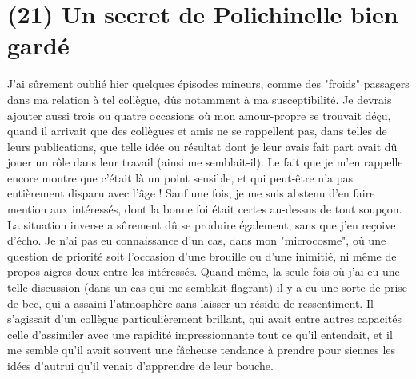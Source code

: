 \section{(21) Un secret de Polichinelle bien gardé}

J'ai sûrement oublié hier quelques épisodes mineurs, comme des "froids" passagers dans ma relation à tel collègue, dûs notamment à ma susceptibilité. Je devrais ajouter aussi trois ou quatre occasions où mon amour-propre se trouvait déçu, quand il arrivait que des collègues et amis ne se rappellent pas, dans telles de leurs publications, que telle idée ou résultat dont je leur avais fait part avait dû jouer un rôle dans leur travail (ainsi me semblait-il). Le fait que je m'en rappelle encore montre que c'était là un point sensible, et qui peut-être n'a pas entièrement disparu avec l'âge ! Sauf une fois, je me suis abstenu d'en faire mention aux intéressés, dont la bonne foi était certes au-dessus de tout soupçon. La situation inverse a sûrement dû se produire également, sans que j'en reçoive d'écho. Je n'ai pas eu connaissance d'un cas, dans mon "microcosme", où une question de priorité soit l'occasion d'une brouille ou d'une inimitié, ni même de propos aigres-doux entre les intéressés. Quand même, la seule fois où j'ai eu une telle discussion (dans un cas qui me semblait flagrant) il y a eu une sorte de prise de bec, qui a assaini l'atmosphère sans laisser un résidu de ressentiment. Il s'agissait d'un collègue particulièrement brillant, qui avait entre autres capacités celle d'assimiler avec une rapidité impressionnante tout ce qu'il entendait, et il me semble qu'il avait souvent une fâcheuse tendance à prendre pour siennes les idées d'autrui qu'il venait d'apprendre de leur bouche.

